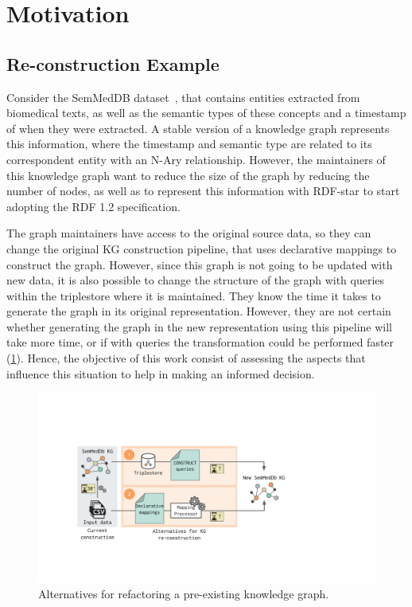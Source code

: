 
\section{Motivation}
\label{sec:chp6-1_mot-example}

\subsection{Re-construction Example}


Consider the SemMedDB dataset~\parencite{SemMedDB}, that contains entities extracted from biomedical texts, as well as the semantic types of these concepts and a timestamp of when they were extracted. A stable version of a knowledge graph represents this information, where the timestamp and semantic type are related to its correspondent entity with an N-Ary relationship. However, the maintainers of this knowledge graph want to reduce the size of the graph by reducing the number of nodes, as well as to represent this information with RDF-star to start adopting the RDF 1.2 specification.

The graph maintainers have access to the original source data, so they can change the original KG construction pipeline, that uses declarative mappings to construct the graph. However, since this graph is not going to be updated with new data, it is also possible to change the structure of the graph with queries within the triplestore where it is maintained. They know the time it takes to generate the graph in its original representation. However, they are not certain whether generating the graph in the new representation using this pipeline will take more time, or if with queries the transformation could be performed faster (\cref{fig:chp6-1_mot-example}). Hence, the objective of this work consist of assessing the aspects that influence this situation to help in making an informed decision.


\begin{figure}[b!]
    \centering
    \includegraphics[width=0.8\linewidth]{figures/chp6-1_motivating-example.pdf}
    \caption[KG re-construction alternatives]{Alternatives for refactoring a pre-existing knowledge graph.}
    \label{fig:chp6-1_mot-example}
\end{figure}



